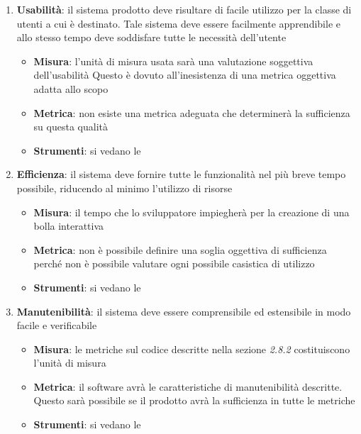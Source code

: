 {\begin{enumerate}
  \item \textbf{Usabilità}: il sistema prodotto deve risultare di facile
    utilizzo per la classe di utenti a cui è destinato. Tale sistema
    deve essere facilmente apprendibile e allo stesso tempo deve
    soddisfare tutte le necessità dell'utente
    \begin{itemize}
    \item \textbf{Misura}: l'unità di misura usata sarà una valutazione soggettiva dell'usabilità Questo è dovuto all'inesistenza di una metrica oggettiva adatta allo scopo
    \item \textbf{Metrica}:  non esiste una metrica adeguata che determinerà la sufficienza su questa qualità
    \item \textbf{Strumenti}: si vedano le  \normediprogetto
    \end{itemize}

  \item \textbf{Efficienza}: il sistema deve fornire tutte le funzionalità nel più breve tempo possibile,
    riducendo al minimo l'utilizzo di risorse
    \begin{itemize}
    \item \textbf{Misura}: il tempo che lo sviluppatore impiegherà per la creazione di una bolla interattiva
    \item \textbf{Metrica}: non è possibile definire una soglia oggettiva di sufficienza perché non è possibile valutare ogni possibile casistica di utilizzo
    \item \textbf{Strumenti}: si vedano le  \normediprogetto
    \end{itemize}

  \item \textbf{Manutenibilità}: il sistema deve essere comprensibile ed estensibile in modo facile e verificabile
    \begin{itemize}
    \item \textbf{Misura}: le metriche sul codice descritte nella sezione \emph{2.8.2}
      costituiscono l'unità di misura
    \item \textbf{Metrica}: il software avrà le caratteristiche di manutenibilità descritte. Questo sarà possibile se il prodotto avrà la sufficienza in tutte le metriche
    \item \textbf{Strumenti}: si vedano le  \normediprogetto
    \end{itemize}


\end{enumerate}}
